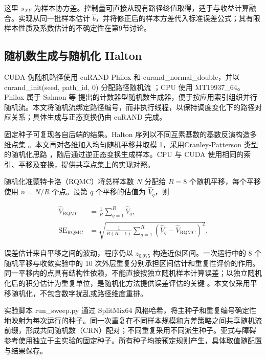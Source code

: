 \documentclass[UTF8,a4paper,zihao=5,fontset=none]{ctexart}
\begin{document}
这里 $s_{XY}$ 为样本协方差。控制量可直接从现有路径终值取得，适于与收益计算融合。实现从同一批样本估计 $\widehat b$，并将修正后的样本方差代入标准误差公式；其有限样本性质及系数估计的不确定性在第9节讨论。


\subsection{随机数生成与随机化 Halton}

CUDA 伪随机路径使用 cuRAND Philox 和 {\small\ttfamily curand\_\allowbreak{}n\allowbreak{}ormal\_\allowbreak{}do\allowbreak{}uble}，并以{\small\ttfamily curand\_\allowbreak{}i\allowbreak{}nit(seed\allowbreak{},\allowbreak{} path\_\allowbreak{}i\allowbreak{}d,\allowbreak{} 0)} 分配路径随机流 \cite{r5}；CPU 使用 MT19937\_64。Philox 属于 Salmon 等 \cite{r7} 提出的计数器型随机数生成器，便于按应用索引组织并行随机流。本文将随机流绑定路径编号，而非执行线程，以保持调度变化下的路径对应关系；具体生成与正态变换仍由 cuRAND 完成。


固定种子可复现各自后端的结果。Halton 序列以不同互素基数的基数反演构造多维点集 \cite{r8}。本文再对各维加入均匀随机平移并取模 1，采用Cranley-Patterson 类型的随机化思路 \cite{r9}，随后通过逆正态变换生成样本。CPU 与 CUDA 使用相同的索引、平移及变换，提供共享点集上的实现对照。


随机化准蒙特卡洛（RQMC）将总样本数 $N$ 分配给 $R=8$ 个随机平移，每个平移使用 $n=N/R$ 个点。设第 $q$ 个平移的估值为 $\widehat V_q$，则


\nopagebreak[4]
\begin{equation}
\label{eq:7}
\begin{aligned}
\widehat V_{\mathrm{RQMC}}&=\frac1R\sum_{q=1}^{R}\widehat V_q,\\
\operatorname{SE}_{\mathrm{RQMC}}&=
\sqrt{\frac1{R(R-1)}\sum_{q=1}^{R}
\left(\widehat V_q-\widehat V_{\mathrm{RQMC}}\right)^2}.
\end{aligned}
\end{equation}

误差估计来自平移之间的波动，程序仍以 $z_{0.975}$ 构造近似区间。一次运行中的 8 个随机平移与收敛实验中的 10 次外层重复分别承担区间估计和重复性评价的作用。同一平移内的点具有结构性依赖，不能直接按独立随机样本计算误差；以独立随机化后的积分估计为重复单位，是随机化方法提供误差评估的关键 \cite{r9}。本文仅采用平移随机化，不包含数字扰乱或路径维度重排。


实验脚本 {\small\ttfamily run\_\allowbreak{}sweep.\allowbreak{}py} 通过 SplitMix64 风格哈希，将主种子和重复编号确定性地映射为每次运行的种子。同一次重复在不同样本规模和方差策略之间共享随机流前缀，形成共同随机数（CRN）配对；不同重复采用不同派生种子。亚式与障碍参考使用独立于主实验的固定种子。所有种子均按预定规则产生，具体取值随配置与结果保存。
\end{document}
